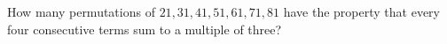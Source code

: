 How many permutations of $21,31,41,51,61,71,81$ have the property that every four consecutive terms sum to a multiple of three?
